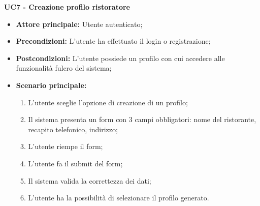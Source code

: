 \textbf{UC7 - Creazione profilo ristoratore}
\begin{itemize}
    \item \textbf{Attore principale: }Utente autenticato;
    \item \textbf{Precondizioni: }L'utente ha effettuato il login o registrazione;
    \item \textbf{Postcondizioni: }L'utente possiede un profilo con cui accedere alle funzionalità fulcro del sistema;
    \item \textbf{Scenario principale:}
        \begin{enumerate}
            \item L'utente sceglie l'opzione di creazione di un profilo;
            \item Il sistema presenta un form con 3 campi obbligatori: nome del ristorante, recapito telefonico, indirizzo;
            \item L'utente riempe il form;
            \item L'utente fa il submit del form;
            \item Il sistema valida la correttezza dei dati;
            \item L'utente ha la possibilità di selezionare il profilo generato.
        \end{enumerate}
\end{itemize}
